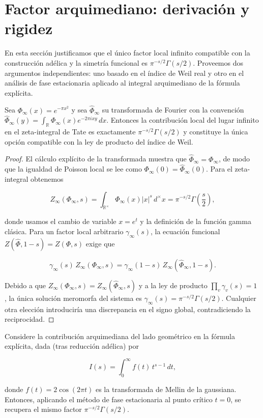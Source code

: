 \section{Factor arquimediano: derivación y rigidez}

En esta sección justificamos que el único factor local infinito compatible con la
construcción adélica y la simetría funcional es $\pi^{-s/2}\Gamma(s/2)$.  Proveemos
dos argumentos independientes: uno basado en el índice de Weil real y otro en el
análisis de fase estacionaria aplicado al integral arquimediano de la fórmula
explícita.

\begin{theorem}\label{thm:gamma-weil}
Sea $\Phi_\infty(x)=e^{-\pi x^2}$ y sea $\widehat{\Phi}_\infty$ su transformada de
Fourier con la convención
$\widehat{\Phi}_\infty(y)=\int_\mathbb{R}\Phi_\infty(x)e^{-2\pi i xy}\,dx$.
Entonces la contribución local del lugar infinito en el zeta-integral de Tate es
exactamente $\pi^{-s/2}\Gamma(s/2)$ y constituye la única opción compatible con la
ley de producto del índice de Weil.
\end{theorem}

\begin{proof}
El cálculo explícito de la transformada muestra que
$\widehat{\Phi}_\infty=\Phi_\infty$, de modo que la igualdad de Poisson local se
lee como $\Phi_\infty(0)=\widehat{\Phi}_\infty(0)$.  Para el zeta-integral obtenemos

\[
 Z_\infty(\Phi_\infty,s)
 =\int_{\mathbb{R}^\times} \Phi_\infty(x) |x|^{s}\,d^\times x
 =\pi^{-s/2}\Gamma\!\left(\frac{s}{2}\right),
\]

donde usamos el cambio de variable $x=e^t$ y la definición de la función gamma
clásica.  Para un factor local arbitrario $\gamma_\infty(s)$, la ecuación
funcional $Z(\widehat{\Phi},1-s)=Z(\Phi,s)$ exige que

\[
 \gamma_\infty(s)\,Z_\infty(\Phi_\infty,s)
 =\gamma_\infty(1-s)\,Z_\infty(\widehat{\Phi}_\infty,1-s).
\]

Debido a que $Z_\infty(\Phi_\infty,s)=Z_\infty(\widehat{\Phi}_\infty,s)$ y a la ley
de producto $\prod_v \gamma_v(s)=1$ \cite{Weil1964}, la única solución meromorfa
del sistema es $\gamma_\infty(s)=\pi^{-s/2}\Gamma(s/2)$.  Cualquier otra elección
introduciría una discrepancia en el signo global, contradiciendo la reciprocidad.
\end{proof}

\begin{theorem}\label{thm:gamma-stationary}
Considere la contribución arquimediana del lado geométrico en la fórmula
explícita, dada (tras reducción adélica) por

\[
 I(s)=\int_0^\infty f(t)\,t^{s-1}\,dt,
\]

donde $f(t)=2\cos(2\pi t)$ es la transformada de Mellin de la gaussiana.
Entonces, aplicando el método de fase estacionaria al punto crítico $t=0$, se
recupera el mismo factor $\pi^{-s/2}\Gamma(s/2)$.
\end{theorem}

